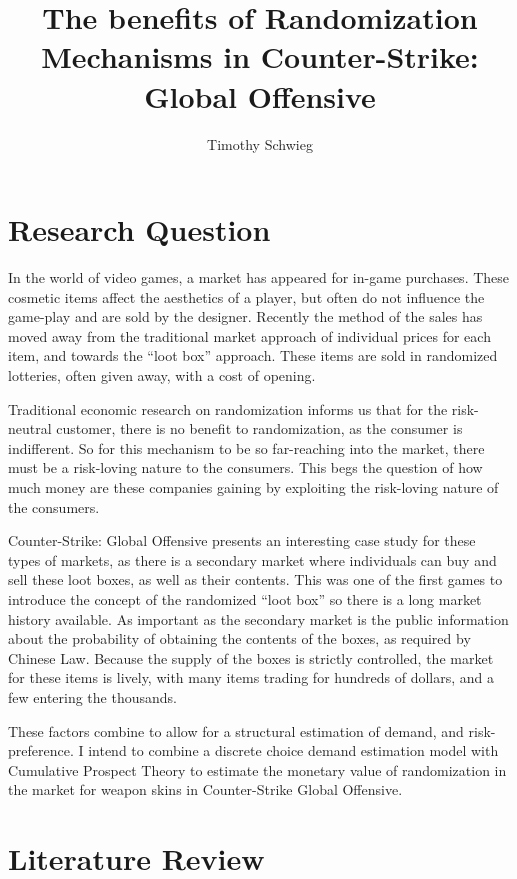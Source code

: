 \documentclass[12pt]{paper}
\title{The benefits of Randomization Mechanisms in Counter-Strike:
  Global Offensive}
\author{Timothy Schwieg}
\begin{document}
\maketitle

\section{Research Question}


In the world of video games, a market has appeared for in-game
purchases. These cosmetic items affect the aesthetics of a player, but
often do not influence the game-play and are sold by the
designer. Recently the method of the sales has moved away from the
traditional market approach of individual prices for each item, and
towards the ``loot box'' approach. These items are sold in randomized
lotteries, often given away, with a cost of opening.

Traditional economic research on randomization informs us that for the
risk-neutral customer, there is no benefit to randomization, as the
consumer is indifferent. So for this mechanism to be so far-reaching
into the market, there must be a risk-loving nature to the
consumers. This begs the question of how much money are these
companies gaining by exploiting the risk-loving nature of the
consumers.

Counter-Strike: Global Offensive presents an interesting case study for
these types of markets, as there is a secondary market where
individuals can buy and sell these loot boxes, as well as their
contents. This was one of the first games to introduce the concept of
the randomized ``loot box'' so there is a long market history
available. As important as the secondary market is the public
information about the probability of obtaining the contents of the
boxes, as required by Chinese Law. Because the supply of the boxes is
strictly controlled, the market for these items is lively, with many
items trading for hundreds of dollars, and a few entering the thousands.

These factors combine to allow for a structural estimation of demand,
and risk-preference. I intend to combine a discrete choice demand
estimation model with Cumulative Prospect Theory to estimate the
monetary value of randomization in the market for weapon skins in
Counter-Strike Global Offensive.

\section{Literature Review}
\end{document}
